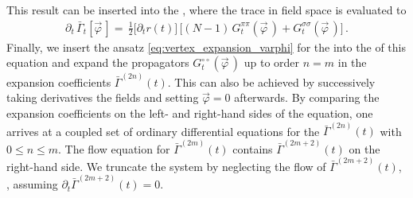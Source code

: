 This result can be inserted into the \frgEquation{}, where the trace in field space is evaluated to
\begin{align}
	\partial_t\, \bar{\Gamma}_t [ \vec{\varphi} \, ] = \, \frac{1}{2} \big[  \partial_t r ( t ) \big] \, \big[  ( N - 1 ) \, G^{\pi \pi}_t ( \vec{\varphi} \, ) + G^{\sigma \sigma}_t ( \vec{\varphi} \, ) \big] \, .\label{eq:wetterich_equation_vertex_expansion}
\end{align}
Finally, we insert the ansatz \eqref{eq:vertex_expansion_varphi} for the \eaa{} into the \lhs{} of this equation and expand the propagators $G^{\circ \circ}_t ( \vec{\varphi} \, )$ up to order $n=m$ in the expansion coefficients $\bar{\Gamma}^{(2n)} ( t )$.
This can also be achieved by successively taking derivatives \wrt{} the fields and setting $\vec{\varphi} = 0$ afterwards.
By comparing the expansion coefficients on the left- and right-hand sides of the equation, one arrives at a coupled set of ordinary differential equations for the $\bar{\Gamma}^{(2n)} ( t )$ with $0 \leq n \leq m$.
The flow equation for $\bar{\Gamma}^{(2m)} ( t )$ contains $\bar{\Gamma}^{(2m+2)} ( t )$ on the right-hand side.
We truncate the system by neglecting the flow of $\bar{\Gamma}^{(2m+2)} ( t )$, \ie{}, assuming $\partial_t \bar{\Gamma}^{( 2 m + 2 )} ( t ) = 0$.


